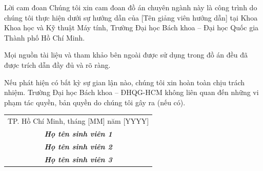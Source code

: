 \begin{preface}{Lời cam đoan}
  Chúng tôi xin cam đoan đồ án chuyên ngành này là công trình do chúng tôi thực hiện dưới sự hướng dẫn của [Tên giảng viên hướng dẫn] tại Khoa Khoa học và Kỹ thuật Máy tính, Trường Đại học Bách khoa -- Đại học Quốc gia Thành phố Hồ Chí Minh.

  \noindent Mọi nguồn tài liệu và tham khảo bên ngoài được sử dụng trong đồ án đều đã được trích dẫn đầy đủ và rõ ràng.

  \noindent Nếu phát hiện có bất kỳ sự gian lận nào, chúng tôi xin hoàn toàn chịu trách nhiệm. Trường Đại học Bách khoa -- ĐHQG-HCM không liên quan đến những vi phạm tác quyền, bản quyền do chúng tôi gây ra (nếu có).

  \vspace{2cm}

  \begin{flushright}
    \begin{tabular}{c}
      TP. Hồ Chí Minh, tháng [MM] năm [YYYY] \\
      \textit{\textbf{Họ tên sinh viên 1}} \\
      \textit{\textbf{Họ tên sinh viên 2}} \\
      \textit{\textbf{Họ tên sinh viên 3}} \\
    \end{tabular}
  \end{flushright}
\end{preface}
